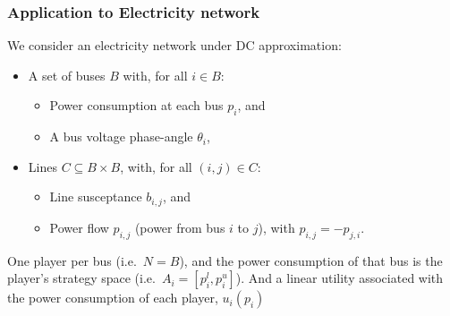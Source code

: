\begin{frame}
\frametitle{Application to Electricity network}
We consider an electricity network under DC approximation:
\begin{itemize}
    \item A set of buses $B$ with, for all $i\in B$:
    \begin{itemize} 
        \item Power consumption at each bus $p_i$, and 
        \item A bus voltage phase-angle $\theta_i$,
    \end{itemize}
    \item Lines $C\subseteq B\times B$, with, for all $(i,j)\in C$: 
        \begin{itemize} 
        \item Line susceptance $b_{i,j}$, and 
        \item Power flow $p_{i,j}$ (power from bus $i$ to $j$), with $p_{i,j}=-p_{j,i}$. 
    \end{itemize}
\end{itemize}

One player per bus (i.e.~$N=B$), and the power consumption of that bus is the player's strategy space (i.e.\ $A_i=[p_i^l,p_i^u]$).
And a linear utility associated with the power consumption of each player, $u_i(p_i)$
\end{frame}

